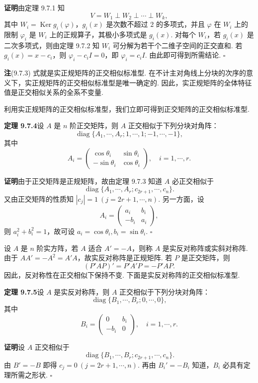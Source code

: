 \documentclass[UTF8, 12pt, fontset=fandol, oneside]{ctexart}
\begin{document}
\noindent\textbf{证明}\quad 由定理 9.7.1 知
\[
  V=W_1\perp W_2\perp\cdots\perp W_k,
\]
其中 $W_i=\operatorname{Ker}g_i(\varphi)$，$g_i(x)$ 是次数不超过 $2$ 的多项式，并且 $\varphi$ 在 $W_i$ 上的限制 $\varphi_i$ 是 $W_i$ 上的正规算子，其极小多项式是 $g_i(x)$. 对每个 $W_i$，若 $g_i(x)$ 是二次多项式，则由定理 9.7.2 知 $W_i$ 可分解为若干个二维子空间的正交直和. 若 $g_i(x)=x-c_i$，则 $\varphi_i-c_iI=0$，即 $\varphi_i=c_iI$. 由此即可得到所需结论. $\square$

\noindent\textbf{注}\quad (9.7.3) 式就是实正规矩阵的正交相似标准型. 在不计主对角线上分块的次序的意义下，实正规矩阵的正交相似标准型是唯一确定的. 因此，实正规矩阵的全体特征值是正交相似关系的全系不变量.

利用实正规矩阵的正交相似标准型，我们立即可得到正交矩阵的正交相似标准型.

\noindent\textbf{定理 9.7.4}\quad 设 $A$ 是 $n$ 阶正交矩阵，则 $A$ 正交相似于下列分块对角阵：
\[
  \operatorname{diag}\{A_1,\cdots,A_r;1,\cdots,1;-1,\cdots,-1\},
\]
其中
\[
  A_i=
  \left(\begin{array}{cc}
    \cos\theta_i & \sin\theta_i\\
    -\sin\theta_i & \cos\theta_i
  \end{array}\right),\quad i=1,\cdots,r.
\]

\noindent\textbf{证明}\quad 由于正交矩阵是正规矩阵，故由定理 9.7.3 知道 $A$ 必正交相似于
\[
  \operatorname{diag}\{A_1,\cdots,A_r;c_{2r+1},\cdots,c_n\}.
\]
又由正交矩阵的性质知 $|c_j|=1\ (j=2r+1,\cdots,n)$. 另一方面，设
\[
  A_i=
  \left(\begin{array}{cc}
    a_i & b_i\\
    -b_i & a_i
  \end{array}\right),
\]
则 $a_i^2+b_i^2=1$，故可设 $a_i=\cos\theta_i,b_i=\sin\theta_i$. $\square$

设 $A$ 是 $n$ 阶实方阵，若 $A$ 适合 $A'=-A$，则称 $A$ 是实反对称阵或实斜对称阵. 由于 $AA'=-A^2=A'A$，故实反对称阵是正规矩阵. 若 $P$ 是正交矩阵，则
\[
  (P'AP)'=P'A'P=-P'AP.
\]
因此，反对称性在正交相似下保持不变. 下面是实反对称阵的正交相似标准型.

\noindent\textbf{定理 9.7.5}\quad 设 $A$ 是实反对称阵，则 $A$ 正交相似于下列分块对角阵：
\[
  \operatorname{diag}\{B_1,\cdots,B_r;0,\cdots,0\},
\]
其中
\[
  B_i=
  \left(\begin{array}{cc}
    0 & b_i\\
    -b_i & 0
  \end{array}\right),\quad i=1,\cdots,r.
\]

\noindent\textbf{证明}\quad 设 $A$ 正交相似于
\[
  \operatorname{diag}\{B_1,\cdots,B_r;c_{2r+1},\cdots,c_n\}.
\]
由 $B'=-B$ 即得 $c_j=0\ (j=2r+1,\cdots,n)$. 再由 $B_i'=-B_i$ 知道，$B_i$ 必具有定理所需之形状. $\square$
\end{document}

